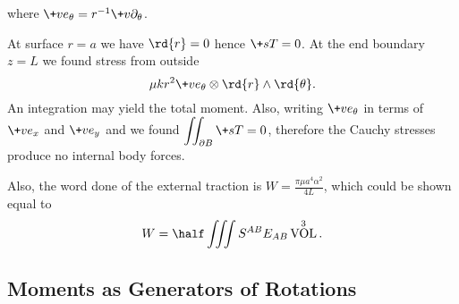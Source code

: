\documentclass[hidelinks]{article}
\DeclareMathOperator{\VOL}{VOL}
\begin{document}
where $\+ve_\theta = r^{-1}\+v\partial_\theta$.
\par
At surface $r=a$ we have $\rd{r} = 0$ hence $\+sT = 0$. At the end boundary $z=L$ we found stress from outside
\[ \mu kr^2 \+ve_\theta \otimes \rd{r}\wedge \rd{\theta}. \]
An integration may yield the total moment. Also, writing $\+ve_\theta$ in terms of $\+ve_x$ and $\+ve_y$ and we found $\displaystyle \iint_{\partial B} \+sT = 0$, therefore the Cauchy stresses produce no internal body forces.
\par
Also, the word done of the external traction is $\displaystyle W = \frac{\pi \mu a^4\alpha^2}{4L}$, which could be shown equal to
\[ W = \half \iiint S^{AB}E_{AB}\VOL^3. \]


\subsection{Moments as Generators of Rotations} %
\label{sub:moments_as_generators_of_rotations}
\end{document}
